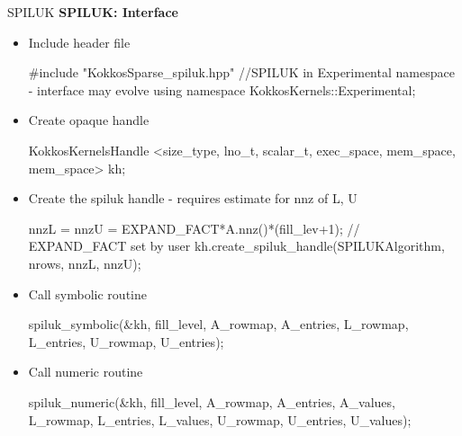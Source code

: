\begin{frame}[fragile]{SPILUK}
\textbf{SPILUK: Interface}

\begin{itemize}
  \item<2-> Include header file
    \begin{code}[keywords={parallel_reduce,for,int,double}, basicstyle=\tiny, breaklines=true]
#include "KokkosSparse_spiluk.hpp"
  //SPILUK in Experimental namespace - interface may evolve
using namespace KokkosKernels::Experimental;
    \end{code}

  \item<3-> Create opaque handle
    \begin{code}[keywords={parallel_reduce,for,int,double}, basicstyle=\tiny, breaklines=true]
KokkosKernelsHandle 
<size_type, lno_t, scalar_t, exec_space, mem_space, mem_space> kh;
    \end{code}

  \item<4-> Create the spiluk handle - requires estimate for nnz of L, U
    \begin{code}[keywords={parallel_reduce,for,int,double}, basicstyle=\tiny, breaklines=true]
nnzL = nnzU = EXPAND_FACT*A.nnz()*(fill_lev+1); // EXPAND_FACT set by user
kh.create_spiluk_handle(SPILUKAlgorithm, nrows, nnzL, nnzU);
    \end{code}

  \item<5-> Call symbolic routine
    \begin{code}[keywords={parallel_reduce,for,int,double}, basicstyle=\tiny, breaklines=true]
spiluk_symbolic(&kh, fill_level, A_rowmap, A_entries, 
                    L_rowmap, L_entries, U_rowmap, U_entries);
    \end{code}

  \item<6-> Call numeric routine
    \begin{code}[keywords={parallel_reduce,for,int,double}, basicstyle=\tiny, breaklines=true]
spiluk_numeric(&kh, fill_level, A_rowmap, A_entries, A_values, 
                                L_rowmap, L_entries, L_values, 
                                U_rowmap, U_entries, U_values);
    \end{code}

\end{itemize}

\end{frame}


